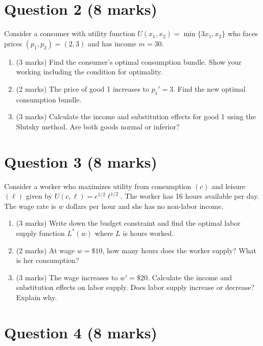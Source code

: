\documentclass[12pt]{article}
\begin{document}
\bigskip

\section*{Question 2 (8 marks)}

Consider a consumer with utility function $U(x_1, x_2) = \min\{3x_1, x_2\}$ who faces prices $(p_1, p_2) = (2, 3)$ and has income $m = 30$.

\begin{enumerate}[label=(\alph*)]
\item (3 marks) Find the consumer's optimal consumption bundle. Show your working including the condition for optimality.
\item (2 marks) The price of good 1 increases to $p_1' = 3$. Find the new optimal consumption bundle.
\item (3 marks) Calculate the income and substitution effects for good 1 using the Slutsky method. Are both goods normal or inferior?
\end{enumerate}

\bigskip

\section*{Question 3 (8 marks)}

Consider a worker who maximizes utility from consumption $(c)$ and leisure $(\ell)$ given by $U(c, \ell) = c^{1/2} \ell^{1/2}$. The worker has 16 hours available per day. The wage rate is $w$ dollars per hour and she has no non-labor income.

\begin{enumerate}[label=(\alph*)]
\item (3 marks) Write down the budget constraint and find the optimal labor supply function $L^*(w)$ where $L$ is hours worked.
\item (2 marks) At wage $w = \$10$, how many hours does the worker supply? What is her consumption?
\item (3 marks) The wage increases to $w' = \$20$. Calculate the income and substitution effects on labor supply. Does labor supply increase or decrease? Explain why.
\end{enumerate}

\bigskip

\section*{Question 4 (8 marks)}
\end{document}
